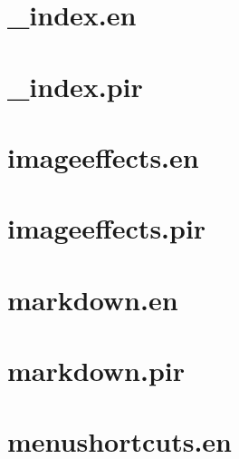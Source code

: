 \let\mypdfximage\pdfximage\def\pdfximage{\immediate\mypdfximage}\documentclass[twoside]{book}
\newcommand{\+}{\discretionary{\mbox{\scriptsize$\hookleftarrow$}}{}{}}
\begin{document}
\chapter{\+\_\+index.\+en}
\label{md_themes_relearn_exampleSite_content_cont_i18n__index_en}

\chapter{\+\_\+index.\+pir}
\label{md_themes_relearn_exampleSite_content_cont_i18n__index_pir}

\chapter{imageeffects.\+en}
\label{md_themes_relearn_exampleSite_content_cont_imageeffects_en}

\chapter{imageeffects.\+pir}
\label{md_themes_relearn_exampleSite_content_cont_imageeffects_pir}

\chapter{markdown.\+en}
\label{md_themes_relearn_exampleSite_content_cont_markdown_en}

\chapter{markdown.\+pir}
\label{md_themes_relearn_exampleSite_content_cont_markdown_pir}

\chapter{menushortcuts.\+en}
\label{md_themes_relearn_exampleSite_content_cont_menushortcuts_en}

\end{document}
